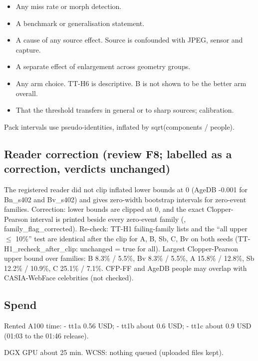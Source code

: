 \documentclass[10pt,twocolumn,letterpaper]{article}
\providecommand{\tightlist}{\setlength{\itemsep}{0pt}\setlength{\parskip}{0pt}}
\begin{document}
\begin{itemize}
\tightlist
\item
  Any miss rate or morph detection.
\item
  A benchmark or generalisation statement.
\item
  A cause of any source effect. Source is confounded with JPEG, sensor and capture.
\item
  A separate effect of enlargement across geometry groups.
\item
  Any arm choice. TT-H6 is descriptive. B is not shown to be the better arm overall.
\item
  That the threshold transfers in general or to sharp sources; calibration.
\end{itemize}

Pack intervals use pseudo-identities, inflated by sqrt(components / people).

\subsection{Reader correction (review F8; labelled as a correction, verdicts unchanged)}\label{reader-correction-review-f8-labelled-as-a-correction-verdicts-unchanged}

The registered reader did not clip inflated lower bounds at 0 (AgeDB -0.001 for Bn\_s402 and Bv\_s402) and gives zero-width bootstrap intervals for zero-event families. Correction: lower bounds are clipped at 0, and the exact Clopper-Pearson interval is printed beside every zero-event family (\protect{}, family\_flag\_corrected). Re-check: TT-H1 failing-family lists and the ``all upper \(\le\) 10\%'' test are identical after the clip for A, B, Sb, C, Bv on both seeds (TT-H1\_recheck\_after\_clip: unchanged = true for all). Largest Clopper-Pearson upper bound over families: B 8.3\% / 5.5\%, Bv 8.3\% / 5.5\%, A 15.8\% / 12.8\%, Sb 12.2\% / 10.9\%, C 25.1\% / 7.1\%. CFP-FF and AgeDB people may overlap with CASIA-WebFace celebrities (not checked).

\subsection{Spend}\label{spend}

Rented A100 time: - tt1a 0.56 USD; - tt1b about 0.6 USD; - tt1c about 0.9 USD (01:03 to the 01:46 release).

DGX GPU about 25 min. WCSS: nothing queued (uploaded files kept).
\end{document}
